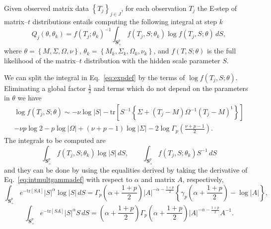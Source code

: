 \documentclass[english,listof=totoc]{scrartcl}
\begin{document}
Given observed matrix data $\left\{T_j\right\}_{j\in J}$, for each observation $T_j$ the E-step of matrix--$t$ distributions entails computing the following integral at step $k$
\begin{equation}
Q_j(\theta,\theta_k)=f(T_j;\theta_k)^{-1}\int_{\mathbf{S}_+^p}f(T_{j},S;\theta_k)\log f\left(T_{j},S;\theta\right)\,dS,\label{eq:expdef}
\end{equation}
where $\theta=\left\{M,\Sigma,\Omega,\nu\right\}$, $\theta_k=\left\{M_k,\Sigma_k,\Omega_k,\nu_k\right\}$, and $f(T,S;\theta)$ is the full likelihood of the matrix--$t$ distribution with the hidden scale parameter $S$.

We can split the integral in Eq.~\eqref{eq:expdef} by the terms of $\log f(T_{j},S;\theta)$. Eliminating a global factor $\frac{1}{2}$ and terms which do not depend on the parameters in $\theta$ we have
\begin{equation}
\begin{split}\log f(T_{j},S;\theta)\sim -\nu\log|S|-\textrm{tr}\left[S^{-1}\left\{\Sigma+(T_j-M)\Omega^{-1}(T_j-M)^{\textrm{t}}\right\}\right]\\
-\nu p\log2-p\log |\Omega|+(\nu+p-1)\log |\Sigma|-2\log\Gamma_{p}\left(\frac{\nu+p-1}{2}\right).
\end{split}\label{eq:logf}
\end{equation}
The integrals to be computed are
\begin{equation}
\int_{\mathbf{S}_+^p}f(T_j,S;\theta_k)\log |S|\,dS, \qquad 
\int_{\mathbf{S}_+^p}f(T_j,S;\theta_k) S^{-1}\,dS
\end{equation}
and they can be done by using the equalities derived by taking the derivative of Eq.~\eqref{eq:intmultgammadef} with respect to $\alpha$ and matrix $A$, respectively,
\begin{equation}
\int_{\mathbf{S}_+^p}e^{-\textrm{tr}\left[SA\right]}|S|^{\alpha}\log |S|\,dS=\Gamma_{p}\left(\alpha+\frac{1+p}{2}\right)|A|^{-\alpha-\frac{1+p}{2}}\left\{\gamma_{p}\left(\alpha+\frac{1+p}{2}\right)-\log |A|\right\},\label{eq:intderivative1}
\end{equation}
\begin{equation}
\int_{\mathbf{S}_+^p}e^{-\textrm{tr}\left[SA\right]}|S|^{\alpha}S\,dS=\left(\alpha+\frac{1+p}{2}\right)\Gamma_{p}\left(\alpha+\frac{1+p}{2}\right)|A|^{-\alpha-\frac{1+p}{2}}A^{-1}.\label{eq:intderivative2}
\end{equation}
\end{document}
